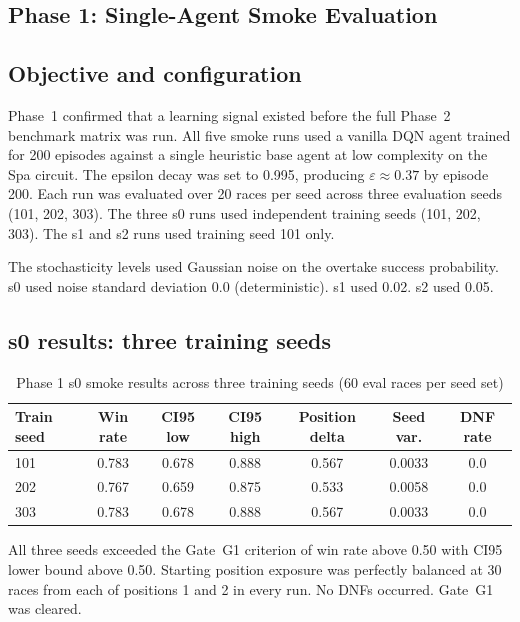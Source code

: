\begin{appendices}
\section{Phase 1: Single-Agent Smoke Evaluation}

\subsection{Objective and configuration}

Phase~1 confirmed that a learning signal existed before the full Phase~2 benchmark matrix was run. All five smoke runs used a vanilla DQN agent trained for 200 episodes against a single heuristic base agent at low complexity on the Spa circuit. The epsilon decay was set to 0.995, producing $\varepsilon \approx 0.37$ by episode 200. Each run was evaluated over 20 races per seed across three evaluation seeds (101, 202, 303). The three s0 runs used independent training seeds (101, 202, 303). The s1 and s2 runs used training seed 101 only.

The stochasticity levels used Gaussian noise on the overtake success probability. s0 used noise standard deviation 0.0 (deterministic). s1 used 0.02. s2 used 0.05.

\subsection{s0 results: three training seeds}

\begin{table}[htbp]
\centering
\small
\caption{Phase 1 s0 smoke results across three training seeds (60 eval races per seed set)}
\label{tab:phase1-s0}
\begin{tabular}{|l|c|c|c|c|c|c|}
\hline
\textbf{Train seed} & \textbf{Win rate} & \textbf{CI95 low} & \textbf{CI95 high} & \textbf{Position delta} & \textbf{Seed var.} & \textbf{DNF rate} \\
\hline
101 & 0.783 & 0.678 & 0.888 & 0.567 & 0.0033 & 0.0 \\
202 & 0.767 & 0.659 & 0.875 & 0.533 & 0.0058 & 0.0 \\
303 & 0.783 & 0.678 & 0.888 & 0.567 & 0.0033 & 0.0 \\
\hline
\end{tabular}
\end{table}

All three seeds exceeded the Gate~G1 criterion of win rate above 0.50 with CI95 lower bound above 0.50. Starting position exposure was perfectly balanced at 30 races from each of positions 1 and 2 in every run. No DNFs occurred. Gate~G1 was cleared.


\end{appendices}
